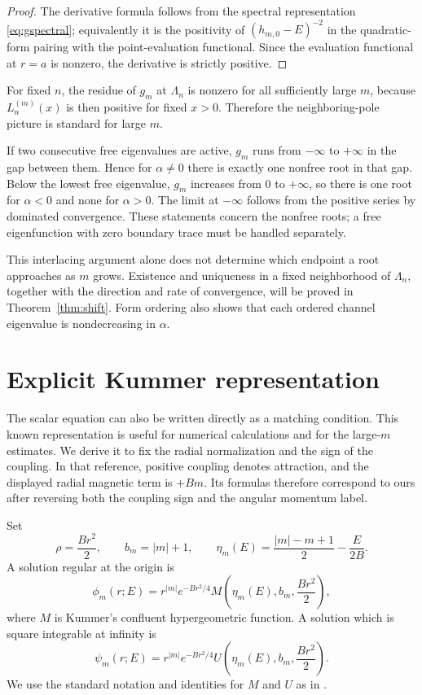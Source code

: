 \documentclass[12pt,a4paper]{article}
\numberwithin{equation}{section}
\theoremstyle{remark}
\theoremstyle{definition}
\newcommand{\Mfun}{M}
\newcommand{\Ufun}{U}
\begin{document}
\begin{proof}
The derivative formula follows from the spectral representation
\eqref{eq:gspectral}; equivalently it is the positivity of
$(h_{m,0}-E)^{-2}$ in the quadratic-form pairing with the point-evaluation functional. Since the evaluation functional at
$r=a$ is nonzero, the derivative is strictly positive.
\end{proof}

For fixed $n$, the residue of $g_m$ at $\Lambda_n$ is nonzero for all
sufficiently large $m$, because $L_n^{(m)}(x)$ is then positive for fixed
$x>0$. Therefore the neighboring-pole picture is standard for large $m$.

If two consecutive free eigenvalues are active, $g_m$ runs from
$-\infty$ to $+\infty$ in the gap between them. Hence for $\alpha\ne0$
there is exactly one nonfree root in that gap. Below the lowest free
eigenvalue, $g_m$ increases from $0$ to $+\infty$, so there is one root
for $\alpha<0$ and none for $\alpha>0$. The limit at $-\infty$ follows
from the positive series by dominated convergence. These statements concern
the nonfree roots; a free eigenfunction with zero boundary trace must be
handled separately.

This interlacing argument alone does not determine which endpoint a root
approaches as $m$ grows. Existence and uniqueness in a fixed neighborhood
of $\Lambda_n$, together with the direction and rate of convergence, will
be proved in Theorem~\ref{thm:shift}. Form ordering also shows that each
ordered channel eigenvalue is nondecreasing in $\alpha$.

\section{Explicit Kummer representation}\label{sec:kummer}

The scalar equation can also be written directly as a matching condition.
This known representation \cite[Sec.~3.1]{ExnerTater2004} is useful for
numerical calculations and for the large-$m$ estimates. We derive it to fix
the radial normalization and the sign of the coupling.
In that reference, positive coupling denotes attraction, and the displayed
radial magnetic term is $+Bm$. Its formulas therefore correspond to ours
after reversing both the coupling sign and the angular momentum label.

Set
\begin{equation}\label{eq:parameters}
\rho=\frac{Br^2}{2},
\qquad
b_m=|m|+1,
\qquad
\eta_m(E)=\frac{|m|-m+1}{2}-\frac{E}{2B}.
\end{equation}
A solution regular at the origin is
\begin{equation}\label{eq:regular-solution}
\phi_m(r;E)
=r^{|m|}e^{-Br^2/4}
\Mfun\left(\eta_m(E),b_m,\frac{Br^2}{2}\right),
\end{equation}
where $\Mfun$ is Kummer's confluent hypergeometric function. A solution which
is square integrable at infinity is
\begin{equation}\label{eq:decaying-solution}
\psi_m(r;E)
=r^{|m|}e^{-Br^2/4}
\Ufun\left(\eta_m(E),b_m,\frac{Br^2}{2}\right).
\end{equation}
We use the standard notation and identities for $\Mfun$ and $\Ufun$ as in
\cite{NIST,DLMF}.
\end{document}
